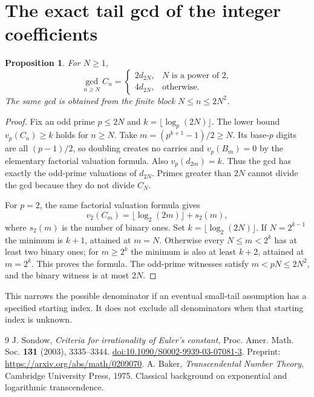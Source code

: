 \documentclass[11pt,a4paper]{article}
\newtheorem{proposition}[theorem]{Proposition}
\theoremstyle{remark}\newtheorem{remark}[theorem]{Remark}
\begin{document}
\appendix
\section{The exact tail gcd of the integer coefficients}
\begin{proposition}
For $N\ge1$,
\[
 \gcd_{n\ge N}C_n=
 \begin{cases}
 2d_{2N},&N\text{ is a power of }2,\\
 4d_{2N},&\text{otherwise}.
 \end{cases}
\]
The same gcd is obtained from the finite block $N\le n\le2N^2$.
\end{proposition}
\begin{proof}
Fix an odd prime $p\le2N$ and $k=\lfloor\log_p(2N)\rfloor$.
The lower bound $v_p(C_n)\ge k$ holds for $n\ge N$. Take
$m=(p^{k+1}-1)/2\ge N$. Its base-$p$ digits are all $(p-1)/2$,
so doubling creates no carries and $v_p(B_m)=0$ by the elementary
factorial valuation formula. Also $v_p(d_{2m})=k$.
Thus the gcd has exactly the odd-prime valuations of $d_{2N}$.
Primes greater than $2N$ cannot divide the gcd because they do not divide $C_N$.

For $p=2$, the same factorial valuation formula gives
\[
 v_2(C_m)=\lfloor\log_2(2m)\rfloor+s_2(m),
\]
where $s_2(m)$ is the number of binary ones. Set $k=\lfloor\log_2(2N)\rfloor$.
If $N=2^{k-1}$ the minimum is $k+1$, attained at $m=N$.
Otherwise every $N\le m<2^k$ has at least two binary ones; for $m\ge2^k$
the minimum is also at least $k+2$, attained at $m=2^k$.
This proves the formula. The odd-prime witnesses satisfy
$m<pN\le2N^2$, and the binary witness is at most $2N$.
\end{proof}
This narrows the possible denominator if an eventual small-tail assumption
has a specified starting index. It does not exclude all denominators when
that starting index is unknown.

\begin{thebibliography}{9}
J. Sondow, \emph{Criteria for irrationality of Euler's constant},
Proc. Amer. Math. Soc. \textbf{131} (2003), 3335--3344.
\href{https://doi.org/10.1090/S0002-9939-03-07081-3}{doi:10.1090/S0002-9939-03-07081-3}.
Preprint: \url{https://arxiv.org/abs/math/0209070}.
A. Baker, \emph{Transcendental Number Theory}, Cambridge University Press, 1975.
Classical background on exponential and logarithmic transcendence.
\end{thebibliography}
\end{document}
